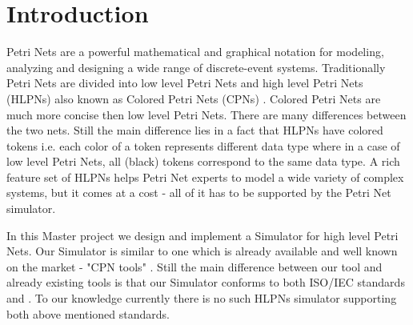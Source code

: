 \chapter{Introduction}

Petri Nets are a powerful mathematical and graphical notation for modeling, analyzing and designing a wide range of discrete-event systems. Traditionally Petri Nets are divided into low level Petri Nets and high level Petri Nets (HLPNs) also known as Colored Petri Nets (CPNs) \cite{cpn-tools-book}. Colored Petri Nets are much more concise then low level Petri Nets. There are many differences between the two nets. Still the main difference lies in a fact that HLPNs have colored tokens i.e. each color of a token represents different data type where in a case of low level Petri Nets, all (black) tokens correspond to the same data type. A rich feature set of HLPNs helps Petri Net experts to model a wide variety of complex systems, but it comes at a cost - all of it has to be supported by the Petri Net simulator.

In this Master project we design and implement a Simulator for high level Petri Nets. Our Simulator is similar to one which is already available and well known on the market - "CPN tools" \cite{cpntools}. Still the main difference between our tool and already existing tools is that our Simulator conforms to both ISO/IEC standards \cite{15909-1:2004} and \cite{15909-2:2011}. To our knowledge currently there is no such HLPNs simulator supporting both above mentioned standards.

